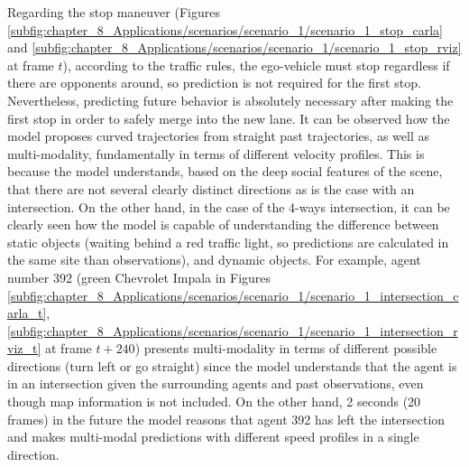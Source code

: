 Regarding the stop maneuver (Figures \ref{subfig:chapter_8_Applications/scenarios/scenario_1/scenario_1_stop_carla} and \ref{subfig:chapter_8_Applications/scenarios/scenario_1/scenario_1_stop_rviz} at frame $t$), according to the traffic rules, the ego-vehicle must stop regardless if there are opponents around, so prediction is not required for the first stop. Nevertheless, predicting future behavior is absolutely necessary after making the first stop in order to safely merge into the new lane. It can be observed how the model proposes curved trajectories from straight past trajectories, as well as multi-modality, fundamentally in terms of different velocity profiles. This is because the model understands, based on the deep social features of the scene, that there are not several clearly distinct directions as is the case with an intersection. On the other hand, in the case of the 4-ways intersection, it can be clearly seen how the model is capable of understanding the difference between static objects (waiting behind a red traffic light, so predictions are calculated in the same site than observations), and dynamic objects. For example, agent number 392 (green Chevrolet Impala in Figures \ref{subfig:chapter_8_Applications/scenarios/scenario_1/scenario_1_intersection_carla_t}, \ref{subfig:chapter_8_Applications/scenarios/scenario_1/scenario_1_intersection_rviz_t} at frame $t+240$) presents multi-modality in terms of different possible directions (turn left or go straight) since the model understands that the agent is in an intersection given the surrounding agents and past observations, even though map information is not included. On the other hand, 2 seconds (20 frames) in the future the model reasons that agent 392 has left the intersection and makes multi-modal predictions with different speed profiles in a single direction.


